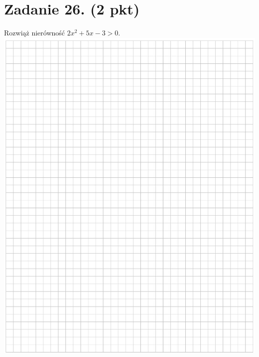 \documentclass[10pt]{article}
\begin{document}
\section*{Zadanie 26. (2 pkt)}
Rozwiąż nierówność \(2 x^{2}+5 x-3>0\).\\
\includegraphics[max width=\textwidth, center]{2024_11_21_779b7f825da3a12753feg-12}
\end{document}
